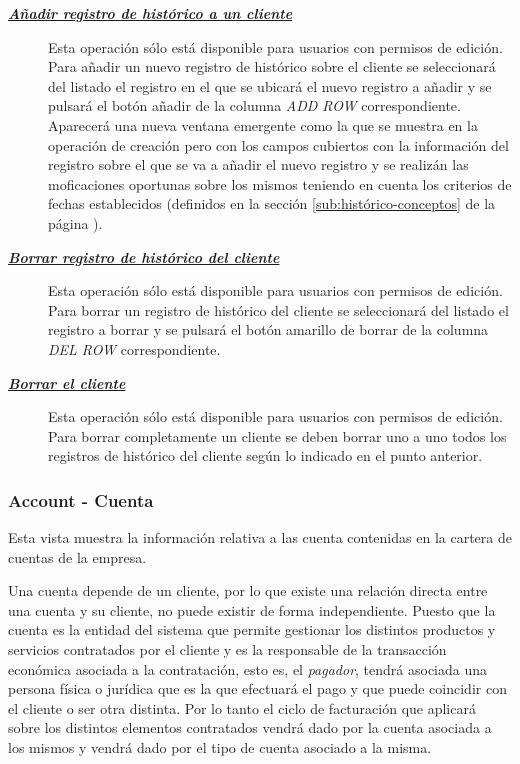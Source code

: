 \begin{description}
\item[\underline{\textsl{\textbf{Añadir registro de histórico a un cliente}}}] Esta operación sólo está disponible para usuarios con permisos de edición.
Para añadir un nuevo registro de histórico sobre el cliente se seleccionará del listado el registro en el que se ubicará el nuevo registro a añadir y se pulsará el botón añadir de la columna \textit{ADD ROW} correspondiente. Aparecerá una nueva ventana emergente como la que se muestra en la operación de creación pero con los campos cubiertos con la información del registro sobre el que se va a añadir el nuevo registro y se realizán las moficaciones oportunas sobre los mismos teniendo en cuenta los criterios de fechas establecidos (definidos en la sección \ref{sub:histórico-conceptos} de la página \pageref{sub:histórico-conceptos}).


\item[\underline{\textsl{\textbf{Borrar registro de histórico del cliente }}}] Esta operación sólo está disponible para usuarios con permisos de edición.
Para borrar un registro de histórico del cliente se seleccionará del listado el registro a borrar y se pulsará el botón amarillo de borrar de la columna \textit{DEL ROW} correspondiente.

\item[\underline{\textsl{\textbf{Borrar el cliente}}}]
Esta operación sólo está disponible para usuarios con permisos de edición.
Para borrar completamente un cliente se deben borrar uno a uno todos los registros de histórico del cliente según lo indicado en el punto anterior.
\end{description}





\subsubsection{Account - Cuenta}
\label{sub:account}

Esta vista muestra la información relativa a las cuenta contenidas en la cartera de cuentas de la empresa.

Una cuenta depende de un cliente, por lo que existe una relación directa entre una cuenta y su cliente, no puede existir de forma independiente. Puesto que la cuenta es la entidad del sistema que permite gestionar los distintos productos y servicios contratados por el cliente y es la responsable de la transacción económica asociada a la contratación, esto es, el \textit{pagador}, tendrá asociada una persona física o jurídica que es la que efectuará el pago y que puede coincidir con el cliente o ser otra distinta. Por lo tanto el ciclo de facturación que aplicará sobre los distintos elementos contratados vendrá dado por la cuenta asociada a los mismos y vendrá dado por el tipo de cuenta asociado a la misma.


